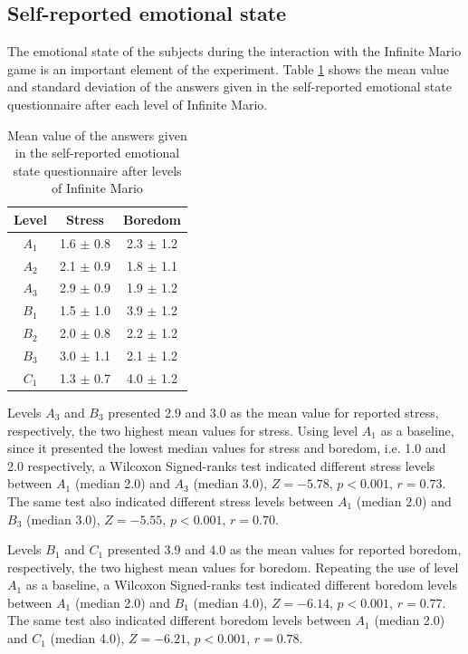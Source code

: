 \subsection{Self-reported emotional state}

The emotional state of the subjects during the interaction with the Infinite Mario game is an important element of the experiment. Table \ref{table:experiment2-mario-emotions} shows the mean value and standard deviation of the answers given in the self-reported emotional state questionnaire after each level of Infinite Mario.

\begin{table}[!htbp]
  \centering
  \caption{Mean value of the answers given in the self-reported emotional state questionnaire after levels of Infinite Mario}
  \label{table:experiment2-mario-emotions}
  \begin{tabular}{ccc}
    \toprule%
      \textbf{Level} & \textbf{Stress} & \textbf{Boredom} \\
    \midrule%
      $A_1$ & 1.6 $\pm$ 0.8 & 2.3 $\pm$ 1.2 \\
      $A_2$ & 2.1 $\pm$ 0.9 & 1.8 $\pm$ 1.1 \\
      $A_3$ & 2.9 $\pm$ 0.9 & 1.9 $\pm$ 1.2 \\
      $B_1$ & 1.5 $\pm$ 1.0 & 3.9 $\pm$ 1.2 \\
      $B_2$ & 2.0 $\pm$ 0.8 & 2.2 $\pm$ 1.2 \\
      $B_3$ & 3.0 $\pm$ 1.1 & 2.1 $\pm$ 1.2 \\
      $C_1$ & 1.3 $\pm$ 0.7 & 4.0 $\pm$ 1.2 \\
    \bottomrule%
  \end{tabular}
\end{table}

Levels $A_3$ and $B_3$ presented 2.9 and 3.0 as the mean value for reported stress, respectively, the two highest mean values for stress. Using level $A_1$ as a baseline, since it presented the lowest median values for stress and boredom, i.e. 1.0 and 2.0 respectively, a Wilcoxon Signed-ranks test indicated different stress levels between $A_1$ (median 2.0) and $A_3$ (median 3.0), $Z=-5.78$, $p < 0.001$, $r=0.73$. The same test also indicated different stress levels between $A_1$ (median 2.0) and $B_3$ (median 3.0), $Z=-5.55$, $p < 0.001$, $r=0.70$.

Levels $B_1$ and $C_1$ presented 3.9 and 4.0 as the mean values for reported boredom, respectively, the two highest mean values for boredom. Repeating the use of level $A_1$ as a baseline, a Wilcoxon Signed-ranks test indicated different boredom levels between $A_1$ (median 2.0) and $B_1$ (median 4.0), $Z=-6.14$, $p < 0.001$, $r=0.77$. The same test also indicated different boredom levels between $A_1$ (median 2.0) and $C_1$ (median 4.0), $Z=-6.21$, $p < 0.001$, $r=0.78$.

